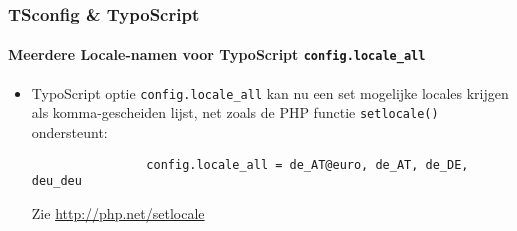 \begin{frame}[fragile]
	\frametitle{TSconfig \& TypoScript}
	\framesubtitle{Meerdere Locale-namen voor TypoScript \texttt{config.locale\_all}}

	\lstset{basicstyle=\small\ttfamily}

	\begin{itemize}

		\item TypoScript optie \texttt{config.locale\_all} kan nu een set mogelijke
			locales krijgen als komma-gescheiden lijst, net zoals de PHP functie
			\texttt{setlocale()} ondersteunt:

			\begin{lstlisting}
				config.locale_all = de_AT@euro, de_AT, de_DE, deu_deu
			\end{lstlisting}

			Zie \url{http://php.net/setlocale}

	\end{itemize}

\end{frame}

